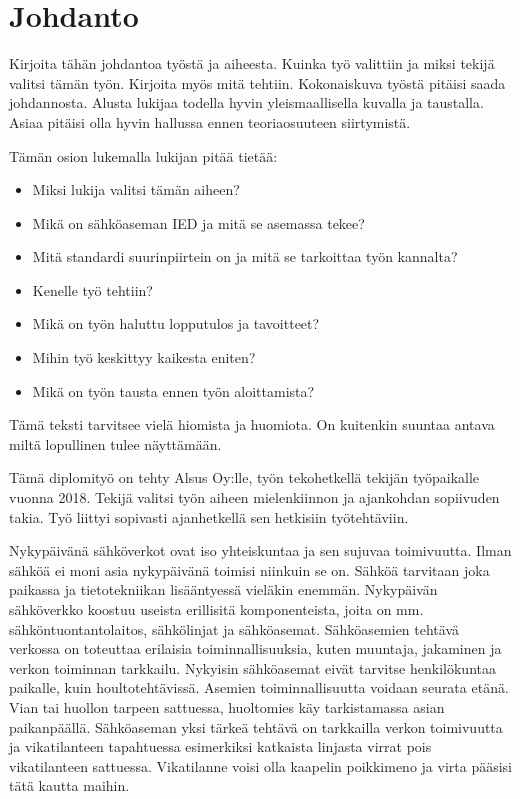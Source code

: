 \chapter{Johdanto}
\label{ch:johdanto}
\begin{it}
	Kirjoita tähän johdantoa työstä ja aiheesta. Kuinka työ valittiin ja miksi tekijä valitsi tämän työn. Kirjoita myös mitä tehtiin. Kokonaiskuva työstä pitäisi saada johdannosta. Alusta lukijaa todella hyvin yleismaallisella kuvalla ja taustalla. Asiaa pitäisi olla hyvin hallussa ennen teoriaosuuteen siirtymistä.
	
	Tämän osion lukemalla lukijan pitää tietää:
	\begin{itemize}
		\item Miksi lukija valitsi tämän aiheen?
		\item Mikä on sähköaseman IED ja mitä se asemassa tekee?
		\item Mitä standardi suurinpiirtein on ja mitä se tarkoittaa työn kannalta?
		\item Kenelle työ tehtiin?
		\item Mikä on työn haluttu lopputulos ja tavoitteet?
		\item Mihin työ keskittyy kaikesta eniten?
		\item Mikä on työn tausta ennen työn aloittamista?
	\end{itemize}
	
	Tämä teksti tarvitsee vielä hiomista ja huomiota. On kuitenkin suuntaa antava miltä lopullinen tulee näyttämään.
\end{it}

Tämä diplomityö on tehty Alsus Oy:lle, työn tekohetkellä tekijän työpaikalle vuonna 2018. Tekijä valitsi työn aiheen mielenkiinnon ja ajankohdan sopiivuden takia. Työ liittyi sopivasti ajanhetkellä sen hetkisiin työtehtäviin.

Nykypäivänä sähköverkot ovat iso yhteiskuntaa ja sen sujuvaa toimivuutta. Ilman sähköä ei moni asia nykypäivänä toimisi niinkuin se on. Sähköä tarvitaan joka paikassa ja tietotekniikan lisääntyessä vieläkin enemmän. Nykypäivän sähköverkko koostuu useista erillisitä komponenteista, joita on mm. sähköntuontantolaitos, sähkölinjat ja sähköasemat. Sähköasemien tehtävä verkossa on toteuttaa erilaisia toiminnallisuuksia, kuten muuntaja, jakaminen ja verkon toiminnan tarkkailu. Nykyisin sähköasemat eivät tarvitse henkilökuntaa paikalle, kuin houltotehtävissä. Asemien toiminnallisuutta voidaan seurata etänä. Vian tai huollon tarpeen sattuessa, huoltomies käy tarkistamassa asian paikanpäällä. Sähköaseman yksi tärkeä tehtävä on tarkkailla verkon toimivuutta ja vikatilanteen tapahtuessa esimerkiksi katkaista linjasta virrat pois vikatilanteen sattuessa. Vikatilanne voisi olla kaapelin poikkimeno ja virta pääsisi tätä kautta maihin.

